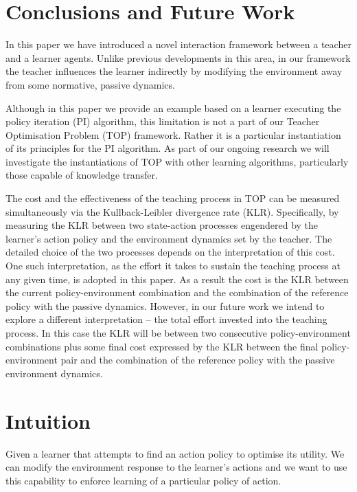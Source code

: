 \documentclass[letterpaper]{aamas2009}
\begin{document}
\section{Conclusions and Future Work}

In this paper we have introduced a novel interaction framework between
a teacher and a learner agents. Unlike previous developments in this
area, in our framework the teacher influences the learner indirectly by
modifying the environment away from some normative, passive
dynamics. 

Although in this paper we provide an example based on a learner
executing the policy iteration (PI) algorithm, this limitation is not
a part of our Teacher Optimisation Problem (TOP) framework. Rather it
is a particular instantiation of its principles for the PI
algorithm. As part of our ongoing research we will investigate the
instantiations of TOP with other learning algorithms, particularly
those capable of knowledge transfer.

The cost and the effectiveness of the teaching process in TOP can
be measured simultaneously via the Kullback-Leibler divergence rate
(KLR). Specifically, by measuring the KLR between two state-action
processes engendered by the learner's action policy and the
environment dynamics set by the teacher. The detailed choice of the
two processes depends on the interpretation of this cost. One such
interpretation, as the effort it takes to sustain the teaching process
at any given time, is adopted in this paper. As a result the cost is
the KLR between the current policy-environment combination and the
combination of the reference policy with the passive
dynamics. However, in our future work we intend to explore a different
interpretation -- the total effort invested into the teaching
process. In this case the KLR will be between two consecutive
policy-environment combinations plus some final cost expressed by the
KLR between the final policy-environment pair and the combination of
the reference policy with the passive environment dynamics. 





\newpage
\appendix
\section{Intuition}
Given a learner that attempts to find an action policy to optimise its
utility. We can modify the environment response to the learner's
actions and we want to use this capability to enforce learning of a
particular policy of action.
\end{document}
